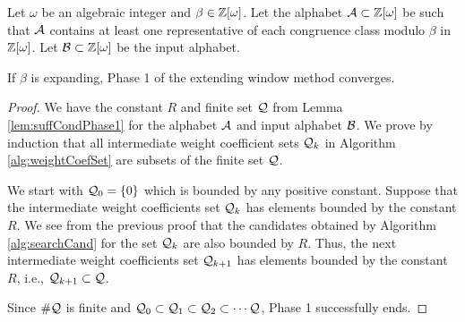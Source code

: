 \begin{thm}
\label{thm:suffCondPhase1}
Let $\omega$ be an algebraic integer and $\beta\in\mathbb{Z}[\omega]$. Let the alphabet $\mathcal{A}\subset\mathbb{Z}[\omega]$ be such that $\mathcal{A}$ contains at least one representative of each congruence class modulo $\beta$ in $\mathbb{Z}[\omega]$. Let $\mathcal{B}\subset\mathbb{Z}[\omega]$ be the input alphabet. 

If $\beta$ is expanding, Phase 1 of the extending window method converges.
\end{thm}
\begin{proof}
We have the constant $R$ and finite set $\mathcal{Q}$ from Lemma \ref{lem:suffCondPhase1} for the alphabet $\mathcal{A}$ and input alphabet $\mathcal{B}$. We prove by induction that  all intermediate weight coefficient sets $\mathcal{Q}_k$ in Algorithm \ref{alg:weightCoefSet} are subsets of the finite set $\mathcal{Q}$. 

We start with $\mathcal{Q}_0=\{0\}$ which is bounded by any positive constant. Suppose that the intermediate weight coefficients set $\mathcal{Q}_k$ has elements bounded by the constant $R$. We see from the previous  proof that the candidates obtained by Algorithm \ref{alg:searchCand} for the set $\mathcal{Q}_k$ are also bounded by $R$. Thus, the next intermediate weight coefficients set $\mathcal{Q}_{k+1}$ has elements bounded by the constant $R$, i.e., $\mathcal{Q}_{k+1}\subset\mathcal{Q}$. 

Since $\#\mathcal{Q}$ is finite and $\mathcal{Q}_0\subset\mathcal{Q}_1\subset\mathcal{Q}_2\subset\cdots\mathcal{Q}$,  Phase 1 successfully ends. 
\end{proof}

